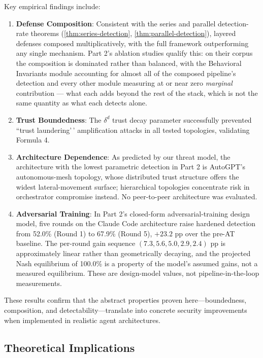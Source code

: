 \documentclass[
]{article}
\providecommand{\tightlist}{%
  \setlength{\itemsep}{0pt}\setlength{\parskip}{0pt}}
\begin{document}
Key empirical findings include:

\begin{enumerate}
\def\labelenumi{\arabic{enumi}.}
\tightlist
\item
  \textbf{Defense Composition}: Consistent with the series and parallel
  detection-rate theorems (\cref{thm:series-detection},
  \cref{thm:parallel-detection}), layered defenses composed
  multiplicatively, with the full framework outperforming any single
  mechanism. Part 2's ablation studies qualify this: on their corpus the
  composition is dominated rather than balanced, with the Behavioral
  Invariants module accounting for almost all of the composed pipeline's
  detection and every other module measuring at or near zero
  \emph{marginal} contribution --- what each adds beyond the rest of the
  stack, which is not the same quantity as what each detects alone.
\item
  \textbf{Trust Boundedness}: The \(\delta^d\) trust decay parameter
  successfully prevented ``trust laundering'\,' amplification attacks in
  all tested topologies, validating Formula 4.
\item
  \textbf{Architecture Dependence}: As predicted by our threat model,
  the architecture with the lowest parametric detection in Part 2 is
  AutoGPT's autonomous-mesh topology, whose distributed trust structure
  offers the widest lateral-movement surface; hierarchical topologies
  concentrate risk in orchestrator compromise instead. No peer-to-peer
  architecture was evaluated.
\item
  \textbf{Adversarial Training}: In Part 2's closed-form
  adversarial-training design model, five rounds on the Claude Code
  architecture raise hardened detection from 52.0\% (Round 1) to 67.9\%
  (Round 5), \(+23.2\) pp over the pre-AT baseline. The per-round gain
  sequence \((7.3, 5.6, 5.0, 2.9, 2.4)\) pp is approximately linear
  rather than geometrically decaying, and the projected Nash equilibrium
  of 100.0\% is a property of the model's assumed gains, not a measured
  equilibrium. These are design-model values, not pipeline-in-the-loop
  measurements.
\end{enumerate}

These results confirm that the abstract properties proven
here---boundedness, composition, and detectability---translate into
concrete security improvements when implemented in realistic agent
architectures.

\subsection{Theoretical
Implications}\label{sec:theoretical-implications}
\end{document}
